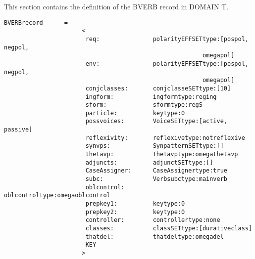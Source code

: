 This section contains the definition of the BVERB record in DOMAIN T.
\begin{verbatim}
BVERBrecord      =
                      <
                       req:               polarityEFFSETtype:[pospol, negpol, 
                                                        omegapol]   
                       env:               polarityEFFSETtype:[pospol, negpol, 
                                                        omegapol]   
                       conjclasses:       conjclasseSETtype:[10]
                       ingform:           ingformtype:reging
                       sform:             sformtype:regS
                       particle:          keytype:0 
                       possvoices:        VoiceSETtype:[active, passive] 
                       reflexivity:       reflexivetype:notreflexive
                       synvps:            SynpatternSETtype:[]
                       thetavp:           Thetavptype:omegathetavp
                       adjuncts:          adjunctSETtype:[]
                       CaseAssigner:      CaseAssignertype:true
                       subc:              Verbsubctype:mainverb
                       oblcontrol:        oblcontroltype:omegaoblcontrol 
                       prepkey1:          keytype:0
                       prepkey2:          keytype:0 
                       controller:        controllertype:none
                       classes:           classSETtype:[durativeclass]
                       thatdel:           thatdeltype:omegadel      
                       KEY
                      >
\end{verbatim}

\newpage
